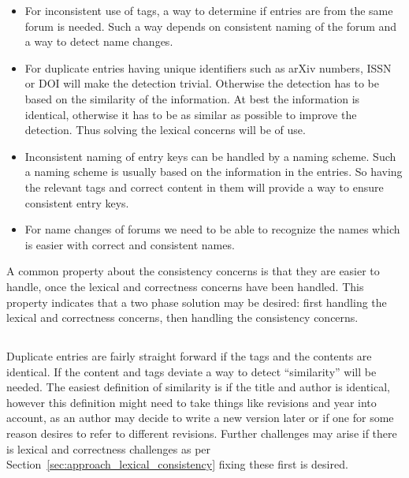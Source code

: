 \begin{itemize}
\item For inconsistent use of tags, a way to determine if entries are
  from the same forum is needed.  Such a way depends on consistent
  naming of the forum and a way to detect name changes.

\item For duplicate entries having unique identifiers such as arXiv
  numbers, ISSN or DOI will make the detection trivial.  Otherwise the
  detection has to be based on the similarity of the information.  At
  best the information is identical, otherwise it has to be as similar
  as possible to improve the detection.  Thus solving the lexical
  concerns will be of use.

\item Inconsistent naming of entry keys can be handled by a naming
  scheme.  Such a naming scheme is usually based on the information in
  the entries.  So having the relevant tags and correct content in
  them will provide a way to ensure consistent entry keys.

\item For name changes of forums we need to be able to recognize the
  names which is easier with correct and consistent names.
\end{itemize}

A common property about the consistency concerns is that they are
easier to handle, once the lexical and correctness concerns have been
handled.  This property indicates that a two phase solution may be
desired: first handling the lexical and correctness concerns, then
handling the consistency concerns.


\subsection{}
\label{sec:approach_duplicates}

Duplicate entries are fairly straight forward if the tags and the
contents are identical.  If the content and tags deviate a way to
detect ``similarity'' will be needed.  The easiest definition of
similarity is if the title and author is identical, however this
definition might need to take things like revisions and year into
account, as an author may decide to write a new version later or if
one for some reason desires to refer to different revisions.  Further
challenges may arise if there is lexical and correctness challenges as
per Section~\ref{sec:approach_lexical_consistency} fixing these first
is desired.


